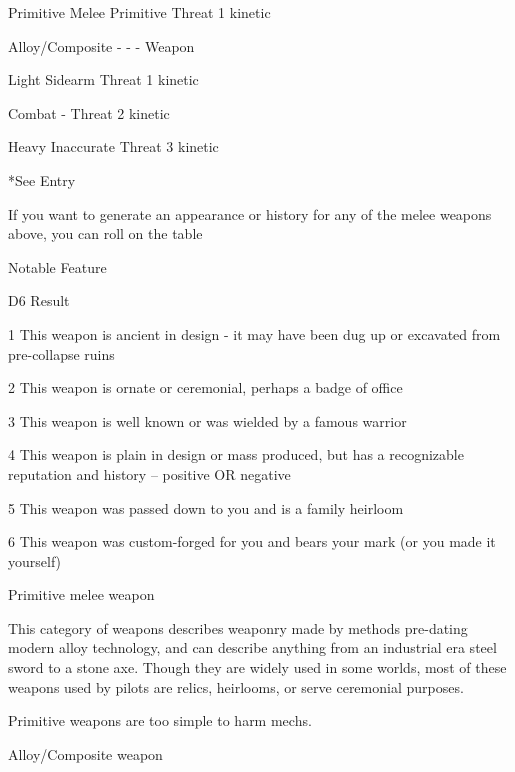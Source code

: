 Primitive Melee           Primitive                                  Threat            1 kinetic 

 Alloy/Composite           -                                          -                 - 
 Weapon 

                    Light  Sidearm                                    Threat            1 kinetic 

                 Combat    -                                          Threat            2 kinetic 

                  Heavy    Inaccurate                                 Threat            3 kinetic 

*See Entry
 

                                                                                                             


If you want to generate an appearance or history for any of the melee weapons above, you can roll on the  
table
 

                                                      Notable Feature
 

 D6      Result 

  1      This weapon is ancient in design - it may have been dug up or excavated from pre-collapse ruins 

 2       This weapon is ornate or ceremonial, perhaps a badge of office 

 3       This weapon is well known or was wielded by a famous warrior 

 4       This weapon is plain in design or mass produced, but has a recognizable reputation and history -- positive  
         OR negative 

 5       This weapon was passed down to you and is a family heirloom 

 6       This weapon was custom-forged for you and bears your mark (or you made it yourself) 

Primitive melee weapon  

This category of weapons describes weaponry made by methods pre-dating modern alloy technology, and  
can describe anything from an industrial era steel sword to a stone axe. Though they are widely used in  
some worlds, most of these weapons used by pilots are relics, heirlooms, or serve ceremonial purposes.  

Primitive weapons are too simple to harm mechs.
 

Alloy/Composite weapon  

